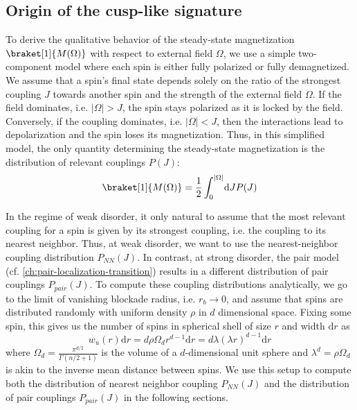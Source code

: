 \newpage
{}


\subsection{Origin of the cusp-like signature}\label{sec:cusp-round-sharp}
To derive the qualitative behavior of the steady-state magnetization $\braket[1]{M(\Omega)}$ with respect to external field $\Omega$, we use a simple two-component model where each spin is either fully polarized or fully demagnetized. We assume that a spin's final state depends solely on the ratio of the strongest coupling $J$ towards another spin and the strength of the external field $\Omega$. If the field dominates, i.e. $|\Omega| > J$, the spin stays polarized as it is locked by the field. Conversely, if the coupling dominates, i.e. $|\Omega| < J$, then the interactions lead to depolarization and the spin loses its magnetization. Thus, in this simplified model, the only quantity determining the steady-state magnetization is the distribution of relevant couplings $P(J)$:
\begin{equation}\label{eq:Cusp-simple-model-magnetization}
	\braket[1]{M(\Omega)} = \frac{1}{2}\int_0^{|\Omega|}\!\mathrm{d}J P(J)
\end{equation}

In the regime of weak disorder, it only natural to assume that the most relevant coupling for a spin is given by its strongest coupling, i.e. the coupling to its nearest neighbor. Thus, at weak disorder, we want to use the nearest-neighbor coupling distribution $P_{NN}(J)$.
In contrast, at strong disorder, the pair model (cf. \autoref{ch:pair-localization-transition}) results in a different distribution of pair couplings $P_{pair}(J)$.
To compute these coupling distributions analytically, we go to the limit of vanishing blockade radius, i.e. $r_b\rightarrow 0$, and assume that spins are distributed randomly with uniform density $\rho$ in $d$ dimensional space. Fixing some spin, this gives us the number of spins in spherical shell of size $r$ and width $\mathrm{d}r$ as
\begin{equation}\label{eq:uniform-spin-distribution}
	w_u(r)\mathrm{d}r = d \rho \Omega_d r^{d-1}\mathrm{d}r = d\lambda (\lambda r)^{d-1}\mathrm{d}r
\end{equation}
where $\Omega_d = \frac{\pi^{d/2}}{\Gamma(n/2+1)}$ is the volume of a $d$-dimensional unit sphere and $\lambda^d = \rho \Omega_d$ is akin to the inverse mean distance between spins. We use this setup to compute both the distribution of nearest neighbor coupling $P_{NN}(J)$ and the distribution of pair couplings $P_{pair}(J)$ in the following sections.


